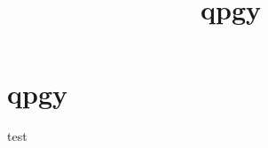 \documentclass{beamer}
\title[qpgy]{qpgy}
\begin{document}
\section{qpgy}
\begin{frame}
test
\end{frame}
\end{document}
